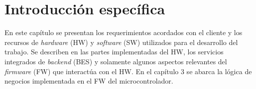 \chapter{Introducción específica} %
\label{Chapter2}
En este capítulo se presentan los requerimientos acordados con el cliente y los recursos de \textit{hardware} (HW) y \textit{software} (SW) utilizados para el desarrollo del trabajo. Se describen en las partes implementadas del HW, los servicios integrados de \textit{backend} (BES) y solamente algunos aspectos relevantes del \textit{firmware} (FW) que interactúa con el HW. En el capítulo 3 se abarca la lógica de negocios implementada en el FW del microcontrolador.\\
